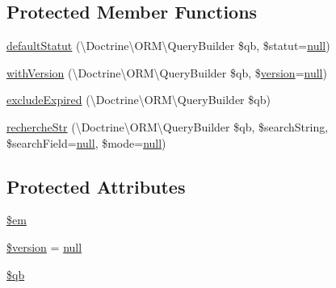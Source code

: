 \subsection*{Protected Member Functions}
\begin{DoxyCompactItemize}
\item 
\hyperlink{class_acme_group_1_1_user_bundle_1_1_entity_1_1_user_repository_a5f42bbc06563fe47010312e4fe730f01}{default\+Statut} (\textbackslash{}Doctrine\textbackslash{}\+O\+R\+M\textbackslash{}\+Query\+Builder \$qb, \$statut=\hyperlink{validate_8js_afb8e110345c45e74478894341ab6b28e}{null})
\item 
\hyperlink{class_acme_group_1_1_user_bundle_1_1_entity_1_1_user_repository_aadc642c896e2bb61ed46ec1c5350e870}{with\+Version} (\textbackslash{}Doctrine\textbackslash{}\+O\+R\+M\textbackslash{}\+Query\+Builder \$qb, \$\hyperlink{jquery-ui_8js_a8fa514f3aed7ddc8bfb00ed5aea5b5e2}{version}=\hyperlink{validate_8js_afb8e110345c45e74478894341ab6b28e}{null})
\item 
\hyperlink{class_acme_group_1_1_user_bundle_1_1_entity_1_1_user_repository_ad2697e37dc6062c2b99c0f5693e4caff}{exclude\+Expired} (\textbackslash{}Doctrine\textbackslash{}\+O\+R\+M\textbackslash{}\+Query\+Builder \$qb)
\item 
\hyperlink{class_acme_group_1_1_user_bundle_1_1_entity_1_1_user_repository_af83fb245e79bfd5496b6911c61be54e8}{recherche\+Str} (\textbackslash{}Doctrine\textbackslash{}\+O\+R\+M\textbackslash{}\+Query\+Builder \$qb, \$search\+String, \$search\+Field=\hyperlink{validate_8js_afb8e110345c45e74478894341ab6b28e}{null}, \$mode=\hyperlink{validate_8js_afb8e110345c45e74478894341ab6b28e}{null})
\end{DoxyCompactItemize}
\subsection*{Protected Attributes}
\begin{DoxyCompactItemize}
\item 
\hyperlink{class_acme_group_1_1_user_bundle_1_1_entity_1_1_user_repository_ad4b9fcee87714596046edad1d1775206}{\$em}
\item 
\hyperlink{class_acme_group_1_1_user_bundle_1_1_entity_1_1_user_repository_aa97ff764be6249b8dfc58586e97a3367}{\$version} = \hyperlink{validate_8js_afb8e110345c45e74478894341ab6b28e}{null}
\item 
\hyperlink{class_acme_group_1_1_user_bundle_1_1_entity_1_1_user_repository_acf15894ed2f0953ab901e9cbbef67454}{\$qb}
\end{DoxyCompactItemize}



